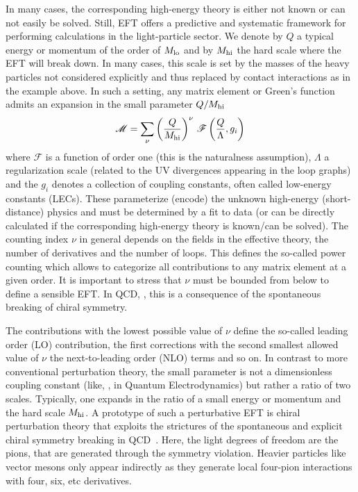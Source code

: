 In many cases, the corresponding high-energy theory
is either not known or can not easily be solved. 
Still, EFT offers a predictive
and systematic framework for performing calculations in the
light-particle sector. We denote by $Q$ a typical energy
or momentum of the order of $M_{\rm lo}$ and by $M_{\rm hi}$ the
hard scale where the EFT will break down. In many cases, this
scale is set by the masses of the heavy particles not considered
explicitly and thus replaced by contact interactions as in the example above.  
In such a setting, any matrix element or Green's
function admits an expansion in the small parameter 
$Q/M_{\rm hi}$~\cite{Weinberg:1978kz}
\begin{equation}
 {\mathcal M} = \sum\limits_{\nu} \left(\frac{Q}{M_{\rm hi}}\right)^{\nu}  
 \,{\mathcal F} \left(\frac{Q}{\Lambda}, g_i\right)
\end{equation}
where ${\mathcal F}$ is a function of order one (this is the naturalness
assumption), $\Lambda$
a regularization scale (related to the UV divergences appearing
in the loop graphs) and the $g_i$ denotes a collection of
coupling constants, often called low-energy constants (LECs).
These parameterize (encode) the unknown high-energy (short-distance)
physics and must be determined by a fit to data (or
can be directly calculated if the corresponding high-energy theory
is known/can be solved). The counting index $\nu$ in general depends 
on the fields in the effective theory, the number of derivatives and
the number of loops. This defines the so-called power counting 
which allows to categorize all contributions to any matrix element
at a given order. It is important to stress that $\nu$ must be
bounded from below to define a sensible EFT. In QCD, \eg, this is 
a consequence of the spontaneous breaking of chiral symmetry. 

The contributions with the lowest possible value of $\nu$ 
define the so-called leading order (LO) contribution, the first
corrections with the second smallest allowed value of $\nu$ the
next-to-leading order (NLO) terms and so on. In contrast to more
conventional perturbation theory, the small parameter is not a 
dimensionless coupling constant (like, \eg, in Quantum Electrodynamics) 
but rather a ratio of two scales. Typically, one
expands in the ratio of a small energy or momentum and 
the hard scale $M_{\rm hi}$. A prototype of such
a perturbative EFT is chiral perturbation theory that exploits the
strictures of the spontaneous and explicit chiral symmetry breaking
in QCD~\cite{Gasser:1983yg,Gasser:1984gg}.  Here, the light degrees
of freedom are the pions, that are generated through the symmetry violation.
Heavier particles like \eg vector mesons only appear indirectly
as they generate local four-pion interactions with four, six, etc
derivatives.

